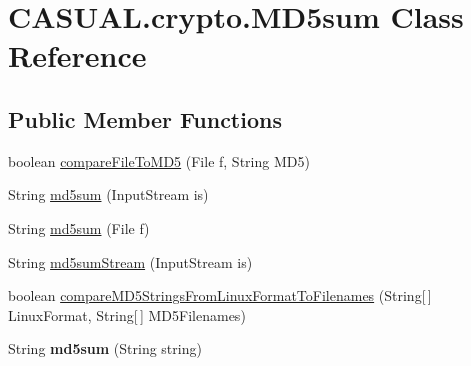 \hypertarget{classCASUAL_1_1crypto_1_1MD5sum}{\section{C\-A\-S\-U\-A\-L.\-crypto.\-M\-D5sum Class Reference}
\label{classCASUAL_1_1crypto_1_1MD5sum}
}
\subsection*{Public Member Functions}
\begin{DoxyCompactItemize}
\item 
boolean \hyperlink{classCASUAL_1_1crypto_1_1MD5sum_a0179d638f6ae800b156ca5919e07abd9}{compare\-File\-To\-M\-D5} (File f, String M\-D5)
\item 
String \hyperlink{classCASUAL_1_1crypto_1_1MD5sum_ab4d622e3672fd560e125788e8c11da65}{md5sum} (Input\-Stream is)
\item 
String \hyperlink{classCASUAL_1_1crypto_1_1MD5sum_aba2245d66d6ca47b7bce88b31fec319d}{md5sum} (File f)
\item 
String \hyperlink{classCASUAL_1_1crypto_1_1MD5sum_ab3881ae275c9c2e89d3bbe0c20267f90}{md5sum\-Stream} (Input\-Stream is)
\item 
boolean \hyperlink{classCASUAL_1_1crypto_1_1MD5sum_a891774e4ad9bd42758f268cff8b99c1a}{compare\-M\-D5\-Strings\-From\-Linux\-Format\-To\-Filenames} (String\mbox{[}$\,$\mbox{]} Linux\-Format, String\mbox{[}$\,$\mbox{]} M\-D5\-Filenames)
\item 
\hypertarget{classCASUAL_1_1crypto_1_1MD5sum_a03e30cfb69b9e4edce983b18db357103}{String {\bfseries md5sum} (String string)}\label{classCASUAL_1_1crypto_1_1MD5sum_a03e30cfb69b9e4edce983b18db357103}


\end{DoxyCompactItemize}

